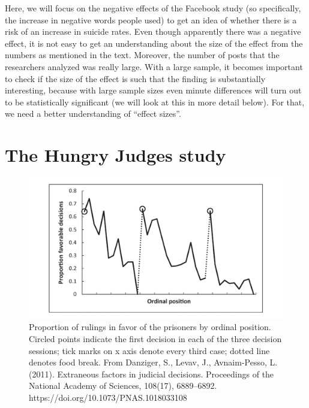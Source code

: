 \documentclass[
  oneside]{book}
\begin{document}
Here, we will focus on the negative effects of the Facebook study (so specifically, the increase in negative words people used) to get an idea of whether there is a risk of an increase in suicide rates. Even though apparently there was a negative effect, it is not easy to get an understanding about the size of the effect from the numbers as mentioned in the text. Moreover, the number of posts that the researchers analyzed was really large. With a large sample, it becomes important to check if the size of the effect is such that the finding is substantially interesting, because with large sample sizes even
minute differences will turn out to be statistically significant (we will look at this in more detail below). For that, we need a better understanding of ``effect sizes''.

\hypertarget{the-hungry-judges-study}{%
\section{The Hungry Judges study}\label{the-hungry-judges-study}}

\begin{figure}

{\centering \includegraphics[width=1\linewidth]{images/hungryjudges} 

}

\caption{Proportion of rulings in favor of the prisoners by ordinal position. Circled points indicate the first decision in each of the three decision sessions; tick marks on x axis denote every third case; dotted line denotes food break. From Danziger, S., Levav, J., Avnaim-Pesso, L. (2011). Extraneous factors in judicial decisions. Proceedings of the National Academy of Sciences, 108(17), 6889–6892. https://doi.org/10.1073/PNAS.1018033108}\label{fig:hungryjudges}
\end{figure}
\end{document}
